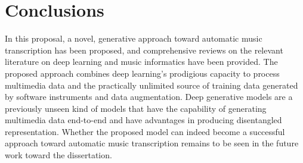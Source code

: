 \section{Conclusions}

In this proposal, a novel, generative approach toward automatic music transcription has been proposed, and comprehensive reviews on the relevant literature on deep learning and music informatics have been provided.
The proposed approach combines deep learning's prodigious capacity to process multimedia data and the practically unlimited source of training data generated by software instruments and data augmentation.
Deep generative models are a previously unseen kind of models that have the capability of generating multimedia data end-to-end and have advantages in producing disentangled representation.
Whether the proposed model can indeed become a successful approach toward automatic music transcription remains to be seen in the future work toward the dissertation.